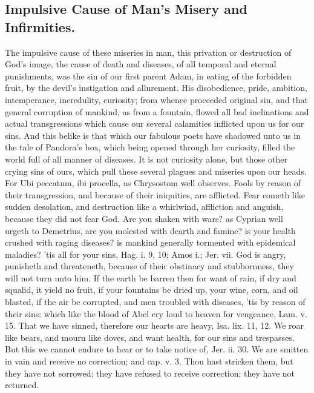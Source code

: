 {\subsection[The Impulsive Cause]{Impulsive Cause of Man's Misery and Infirmities.}
The impulsive cause of these miseries in man, this privation or destruction of God's image, the cause of death and diseases, of all temporal and eternal punishments, was the sin of our first parent Adam, in eating of the forbidden fruit, by the devil's instigation and allurement.
His disobedience, pride, ambition, intemperance, incredulity, curiosity; from whence proceeded original sin, and that general corruption of mankind, as from a fountain, flowed all bad inclinations and actual transgressions which cause our several calamities inflicted upon us for our sins.
And this belike is that which our fabulous poets have shadowed unto us in the tale of  Pandora's box, which being opened through her curiosity, filled the world full of all manner of diseases.
It is not curiosity alone, but those other crying sins of ours, which pull these several plagues and miseries upon our heads.
For Ubi peccatum, ibi procella, as Chrysostom well observes.
Fools by reason of their transgression, and because of their iniquities, are afflicted.
Fear cometh like sudden desolation, and destruction like a whirlwind, affliction and anguish, because they did not fear God.
Are you shaken with wars? as Cyprian well urgeth to Demetrius, are you molested with dearth and famine? is your health crushed with raging diseases? is mankind generally tormented with epidemical maladies? 'tis all for your sins, Hag. i. 9, 10; Amos i.; Jer. vii.
God is angry, punisheth and threateneth, because of their obstinacy and stubbornness, they will not turn unto him.
If the earth be barren then for want of rain, if dry and squalid, it yield no fruit, if your fountains be dried up, your wine, corn, and oil blasted, if the air be corrupted, and men troubled with diseases, 'tis by reason of their sins: which like the blood of Abel cry loud to heaven for vengeance, Lam. v. 15. That we have sinned, therefore our hearts are heavy, Isa. lix. 11, 12.
We roar like bears, and mourn like doves, and want health, \etc{} for our sins and trespasses.
But this we cannot endure to hear or to take notice of, Jer. ii. 30. We are smitten in vain and receive no correction; and cap. v. 3.
Thou hast stricken them, but they have not sorrowed; they have refused to receive correction; they have not returned.
}
